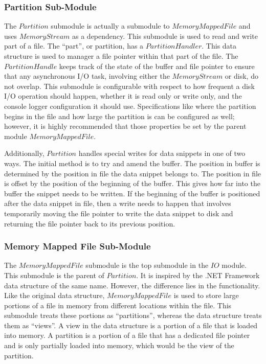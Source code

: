 \subsubsection{Partition Sub-Module}

The $Partition$ submodule is actually a submodule to $MemoryMappedFile$ and uses $MemoryStream$ as a dependency. This submodule is used to read and write part of a file. The ``part'', or partition, has a $PartitionHandler$. This data structure is used to manager a file pointer within that part of the file. The $PartitionHandle$ keeps track of the state of the buffer and file pointer to ensure that any asynchronous I/O task, involving either the $MemoryStream$ or disk, do not overlap. This submodule is configurable with respect to how frequent a disk I/O operation should happen, whether it is read only or write only, and the console logger configuration it should use. Specifications like where the partition begins in the file and how large the partition is can be configured as well; however, it is highly recommended that those properties be set by the parent module $MemoryMappedFile$.

Additionally, $Partition$ handles special writes for data snippets in one of two ways. The initial method is to try and amend the buffer. The position in buffer is determined by the position in file the data snippet belongs to. The position in file is offset by the position of the beginning of the buffer. This gives how far into the buffer the snippet needs to be written. If the beginning of the buffer is positioned after the data snippet in file, then a write needs to happen that involves temporarily moving the file pointer to write the data snippet to disk and returning the file pointer back to its previous position.

\subsubsection{Memory Mapped File Sub-Module}

The $MemoryMappedFile$ submodule is the top submodule in the $IO$ module. This submodule is the parent of $Partition$. It is inspired by the .NET Framework data structure of the same name. However, the difference lies in the functionality. Like the original data structure, $MemoryMappedFile$ is used to store large portions of a file in memory from different locations within the file. This submodule treats these portions as ``partitions'', whereas the data structure treats them as ``views''. A view in the data structure is a portion of a file that is loaded into memory. A partition is a portion of a file that has a dedicated file pointer and is only partially loaded into memory, which would be the view of the partition.

